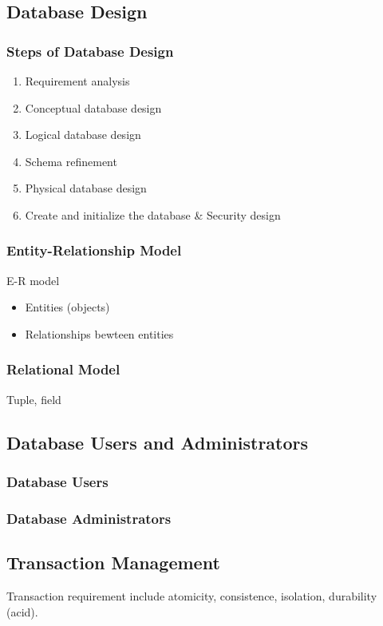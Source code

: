 \subsection{Database Design}
\subsubsection{Steps of Database Design}
\begin{enumerate}
    \item Requirement analysis
    \item Conceptual database design
    \item Logical database design
    \item Schema refinement
    \item Physical database design
    \item Create and initialize the database \& Security design
\end{enumerate}

\subsubsection{Entity-Relationship Model}
E-R model
\begin{itemize}
    \item Entities (objects)
    \item Relationships bewteen entities
\end{itemize}

\subsubsection{Relational Model}
Tuple, field

\subsection{Database Users and Administrators}
\subsubsection{Database Users}


\subsubsection{Database Administrators}

\subsection{Transaction Management}
Transaction requirement include atomicity, consistence, isolation, durability (acid). 

